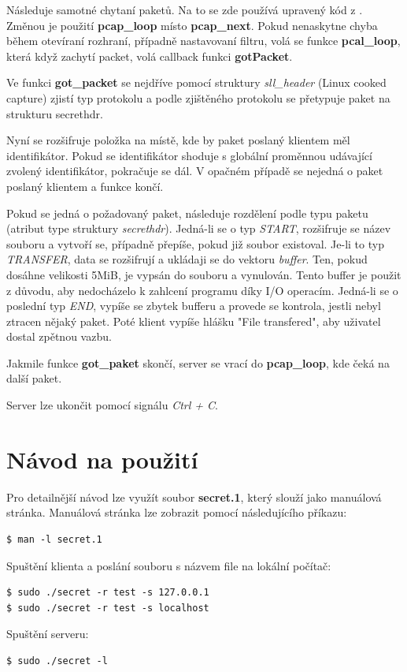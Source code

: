\documentclass[11pt, a4paper]{article}
\begin{document}
Následuje samotné chytaní paketů. Na to se zde používá upravený kód z \cite{Tcpdump}. Změnou je použití \textbf{pcap\_loop} místo \textbf{pcap\_next}. Pokud nenaskytne chyba během otevíraní rozhraní, případně nastavovaní filtru, volá se funkce \textbf{pcal\_loop}, která když zachytí packet, volá callback funkci \textbf{gotPacket}.

Ve funkci \textbf{got\_packet} se nejdříve pomocí struktury \emph{sll\_header} (Linux cooked capture) zjistí typ protokolu a podle zjištěného protokolu se přetypuje paket na strukturu secrethdr.

Nyní se rozšifruje položka na místě, kde by paket poslaný klientem měl identifikátor. Pokud se identifikátor shoduje s globální proměnnou udávající zvolený identifikátor, pokračuje se dál. V opačném případě se nejedná o paket poslaný klientem a funkce končí.

Pokud se jedná o požadovaný paket, následuje rozdělení podle typu paketu (atribut type struktury \emph{secrethdr}). Jedná-li se o typ \emph{START}, rozšifruje se název souboru a vytvoří se, případně přepíše, pokud již soubor existoval. Je-li to typ \emph{TRANSFER}, data se rozšifrují a ukládaji se do vektoru \emph{buffer}. Ten, pokud dosáhne velikosti 5MiB, je vypsán do souboru a vynulován. Tento buffer je použit z důvodu, aby nedocházelo k zahlcení programu díky I/O operacím. Jedná-li se o poslední typ \emph{END}, vypíše se zbytek bufferu a provede se kontrola, jestli nebyl ztracen nějaký paket. Poté klient vypíše hlášku "File transfered", aby uživatel dostal zpětnou vazbu.

Jakmile funkce \textbf{got\_paket} skončí, server se vrací do \textbf{pcap\_loop}, kde čeká na další paket.

Server lze ukončit pomocí signálu \emph{Ctrl + C}.

\section{Návod na použití}
Pro detailnější návod lze využít soubor \textbf{secret.1}, který slouží jako manuálová stránka. Manuálová stránka lze zobrazit pomocí následujícího příkazu: 

\begin{verbatim}
$ man -l secret.1 
\end{verbatim}

\begin{flushleft}

Spuštění klienta a poslání souboru s názvem file na lokální počítač:
\begin{verbatim}
$ sudo ./secret -r test -s 127.0.0.1
$ sudo ./secret -r test -s localhost
\end{verbatim}

Spuštění serveru:

\begin{verbatim}
$ sudo ./secret -l
\end{verbatim}

\end{flushleft}
\end{document}
